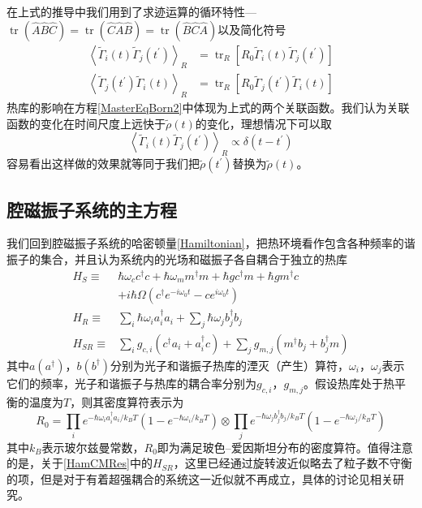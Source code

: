 在上式的推导中我们用到了求迹运算的循环特性---$\operatorname{tr}\left( \hat{A} \hat{B} \hat{C} \right)=\operatorname{tr}\left(\hat{C} \hat{A} \hat{B} \right)= \operatorname{tr} \left( \hat{B} \hat{C} \hat{A} \right)$以及简化符号
\begin{equation}
\begin{aligned}
\left\langle\tilde{\Gamma}_{i}(t) \tilde{\Gamma}_{j}\left(t^{\prime}\right)\right\rangle_{R} &=\operatorname{tr}_{R}\left[R_{0} \tilde{\Gamma}_{i}(t) \tilde{\Gamma}_{j}\left(t^{\prime}\right)\right] \\
\left\langle\tilde{\Gamma}_{j}\left(t^{\prime}\right) \tilde{\Gamma}_{i}(t)\right\rangle_{R} &=\operatorname{tr}_{R}\left[R_{0} \tilde{\Gamma}_{j}\left(t^{\prime}\right) \tilde{\Gamma}_{i}(t)\right]
\end{aligned}
\end{equation}
热库的影响在方程\eqref{MasterEqBorn2}中体现为上式的两个关联函数。我们认为关联函数的变化在时间尺度上远快于$\tilde{\rho}(t)$的变化，理想情况下可以取
\begin{equation}
\left\langle\tilde{\Gamma}_{i}(t) \tilde{\Gamma}_{j}\left(t^{\prime}\right)\right\rangle_{R} \propto \delta\left(t-t^{\prime}\right)
\end{equation}
容易看出这样做的效果就等同于我们把$\tilde{\rho}(t^{\prime})$替换为$\tilde{\rho}(t)$。

\subsection{腔磁振子系统的主方程}
我们回到腔磁振子系统的哈密顿量\eqref{Hamiltonian}，把热环境看作包含各种频率的谐振子的集合，并且认为系统内的光场和磁振子各自耦合于独立的热库
\begin{equation}
\begin{aligned}
H_S\equiv{}&\hbar\omega_{c}c^{\dag}c+\hbar\omega_{m}m^{\dag}m+\hbar gc^{\dag}m+\hbar gm^{\dag}c \\
&+i\hbar\Omega(c^{\dag}e^{-i\omega_{0}t}-ce^{i\omega_{0}t}) \\
H_{R}\equiv&\sum_{i}\hbar\omega_{i}a_{i}^{\dag}a_{i}+\sum_{j}\hbar\omega_{j}b_{j}^{\dag}b_{j} \\
H_{SR}\equiv&\sum_{i}g_{c,i}(c^{\dag}a_{i}+a_{i}^{\dag}c)+\sum_{j}g_{m,j}(m^{\dag}b_{j}+b_{j}^{\dag}m)
\label{HamCMRes}
\end{aligned}
\end{equation}
其中$a(a^{\dag})$，$b(b^{\dag})$分别为光子和谐振子热库的湮灭（产生）算符，$\omega_{i}$，$\omega_{j}$表示它们的频率，光子和谐振子与热库的耦合率分别为$g_{c,i}$，$g_{m,j}$。假设热库处于热平衡的温度为$T$，则其密度算符表示为
\begin{equation}
R_{0}=\prod_{i} e^{-\hbar \omega_{i} a_{i}^{\dag}a_{i} / k_{B} T}\left(1-e^{-\hbar \omega_{i} / k_{B} T}\right) \otimes \prod_{j} e^{-\hbar \omega_{j} b_{j}^{\dag}b_{j} / k_{B} T}\left(1-e^{-\hbar \omega_{j} / k_{B} T}\right)
\label{ThermalState}
\end{equation}
其中$k_{B}$表示玻尔兹曼常数，$R_{0}$即为满足玻色--爱因斯坦分布的密度算符。值得注意的是，关于\eqref{HamCMRes}中的$H_{SR}$，这里已经通过旋转波近似略去了粒子数不守衡的项，但是对于有着超强耦合的系统这一近似就不再成立，具体的讨论见相关研究\cite{PhysRevA.98.053834Ridolfo}。

